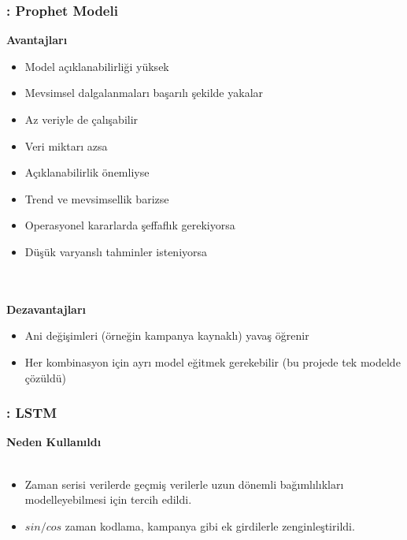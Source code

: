 \documentclass[12pt]{beamer}
\begin{document}
\begin{frame}
	\frametitle{\insertsection: Prophet Modeli}
	\textbf{Avantajları}
	\begin{itemize}
		\item Model açıklanabilirliği yüksek
		\item Mevsimsel dalgalanmaları başarılı şekilde yakalar
		\item Az veriyle de çalışabilir
		\item Veri miktarı azsa
		\item Açıklanabilirlik önemliyse
		\item Trend ve mevsimsellik barizse
		\item Operasyonel kararlarda şeffaflık gerekiyorsa
		\item Düşük varyanslı tahminler isteniyorsa
	\end{itemize}
	\\~\\
	\textbf{Dezavantajları}
	\begin{itemize}
		\item Ani değişimleri (örneğin kampanya kaynaklı) yavaş öğrenir
		\item Her kombinasyon için ayrı model eğitmek gerekebilir (bu
		      projede tek modelde çözüldü)
	\end{itemize}
\end{frame}

\begin{frame}
	\frametitle{\insertsection: LSTM}
	\textbf{Neden Kullanıldı} \\~\\
	\begin{itemize}
		\item Zaman serisi verilerde geçmiş verilerle uzun dönemli
		      bağımlılıkları modelleyebilmesi için tercih edildi.
		\item $sin/cos$ zaman kodlama, kampanya gibi ek girdilerle
		      zenginleştirildi.
	\end{itemize}
\end{frame}
\end{document}
